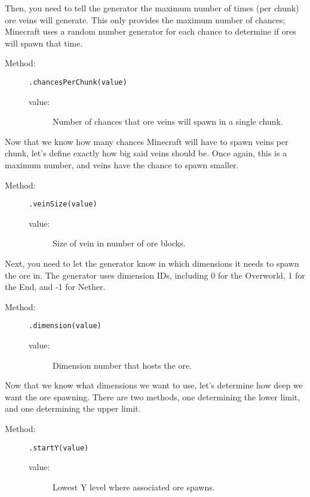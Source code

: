 \documentclass[letterpaper,titlepage,12pt]{article}
\begin{document}
Then, you need to tell the generator the maximum number of times (per chunk) ore veins will generate.  This only provides the maximum number of chances; Minecraft uses a random number generator for each chance to determine if ores will spawn that time.

\begin{description}
\item[Method:] \texttt{.chancesPerChunk(value)}
\begin{description}
\item [value:] Number of chances that ore veins will spawn in a single chunk.
\end{description}
\end{description}

Now that we know how many chances Minecraft will have to spawn veins per chunk, let's define exactly how big said veins should be.  Once again, this is a maximum number, and veins have the chance to spawn smaller.

\begin{description}
\item[Method:] \texttt{.veinSize(value)}
\begin{description}
\item [value:] Size of vein in number of ore blocks.
\end{description}
\end{description}

Next, you need to let the generator know in which dimensions it needs to spawn the ore in.  The generator uses dimension IDs, including 0 for the Overworld, 1 for the End, and -1 for Nether.

\begin{description}
\item[Method:] \texttt{.dimension(value)}
\begin{description}
\item [value:] Dimension number that hosts the ore.
\end{description}
\end{description}

Now that we know what dimensions we want to use, let's determine how deep we want the ore spawning.  There are two methods, one determining the lower limit, and one determining the upper limit.

\begin{description}
\item[Method:] \texttt{.startY(value)}
\begin{description}
\item [value:] Lowest Y level where associated ore spawns.
\end{description}
\end{description}
\end{document}
